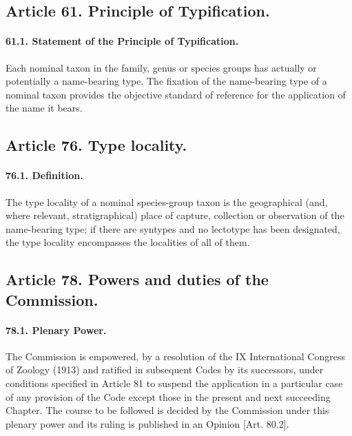 \subsection*{Article 61. Principle of Typification.}

\paragraph*{61.1. Statement of the Principle of Typification.} Each nominal taxon in the family, genus or species groups has actually or potentially a name-bearing type. The fixation of the name-bearing type of a nominal taxon provides the objective standard of reference for the application of the name it bears.

\subsection*{Article 76. Type locality.}

\paragraph*{76.1. Definition.} The type locality of a nominal species-group taxon is the geographical (and, where relevant, stratigraphical) place of capture, collection or observation of the name-bearing type; if there are syntypes and no lectotype has been designated, the type locality encompasses the localities of all of them.

\subsection*{Article 78. Powers and duties of the Commission.}

\paragraph*{78.1. Plenary Power.} The Commission is empowered, by a resolution of the IX International Congress of Zoology (1913) and ratified in subsequent Codes by its successors, under conditions specified in Article 81 to suspend the application in a particular case of any provision of the Code except those in the present and next succeeding Chapter. The course to be followed is decided by the Commission under this plenary power and its ruling is published in an Opinion [Art. 80.2].
\thispagestyle{empty}